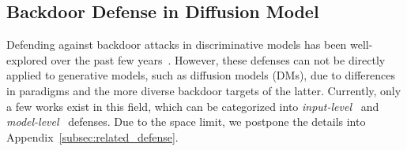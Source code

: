 
\subsection{Backdoor Defense in Diffusion Model}
Defending against backdoor attacks in discriminative models has been well-explored over the past few years~\cite{liu2018fine,wu2021adversarial}. 
However, these defenses can not be directly applied to generative models, such as diffusion models (DMs), due to differences in paradigms and the more diverse backdoor targets of the latter. 
Currently, only a few works exist in this field, which can be categorized into \textit{input-level}~\cite{sui2024disdet,guan2024ufid,chew2024defending,pmlr-v235-mo24a} and \textit{model-level}~\cite{an2024elijah,hao2024diff,wang2025t2ishield} defenses. Due to the space limit, we postpone the details into Appendix~\ref{subsec:related_defense}.


